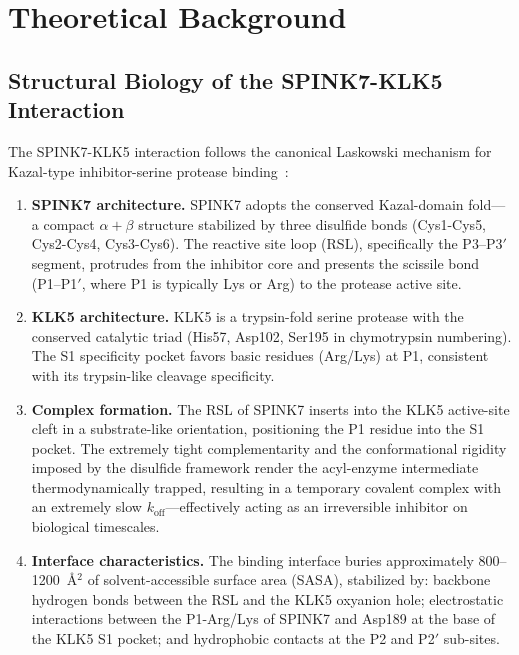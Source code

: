 \documentclass[conference]{IEEEtran}
\begin{document}
\section{Theoretical Background}\label{sec:theory}

\subsection{Structural Biology of the SPINK7-KLK5 Interaction}
\label{sec:structural_biology}

The SPINK7-KLK5 interaction follows the canonical Laskowski mechanism for
Kazal-type inhibitor-serine protease binding~\cite{laskowski1980}:

\begin{enumerate}
  \item \textbf{SPINK7 architecture.} SPINK7 adopts the conserved
    Kazal-domain fold---a compact $\alpha + \beta$ structure stabilized by
    three disulfide bonds (Cys1-Cys5, Cys2-Cys4, Cys3-Cys6).  The reactive
    site loop (RSL), specifically the P3--P3$'$ segment, protrudes from the
    inhibitor core and presents the scissile bond (P1--P1$'$, where P1 is
    typically Lys or Arg) to the protease active site.

  \item \textbf{KLK5 architecture.}  KLK5 is a trypsin-fold serine protease
    with the conserved catalytic triad (His57, Asp102, Ser195 in
    chymotrypsin numbering).  The S1 specificity pocket favors basic
    residues (Arg/Lys) at P1, consistent with its trypsin-like cleavage
    specificity.

  \item \textbf{Complex formation.}  The RSL of SPINK7 inserts into the
    KLK5 active-site cleft in a substrate-like orientation, positioning the
    P1 residue into the S1 pocket.  The extremely tight complementarity and
    the conformational rigidity imposed by the disulfide framework render
    the acyl-enzyme intermediate thermodynamically trapped, resulting in a
    temporary covalent complex with an extremely slow
    $k_{\mathrm{off}}$---effectively acting as an irreversible inhibitor on
    biological timescales.

  \item \textbf{Interface characteristics.}  The binding interface buries
    approximately 800--1200~\AA$^2$ of solvent-accessible surface area
    (SASA), stabilized by: backbone hydrogen bonds between the RSL and the
    KLK5 oxyanion hole; electrostatic interactions between the P1-Arg/Lys
    of SPINK7 and Asp189 at the base of the KLK5 S1 pocket; and
    hydrophobic contacts at the P2 and P2$'$ sub-sites.
\end{enumerate}
\end{document}
